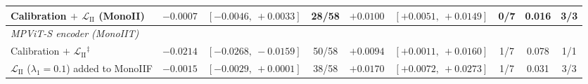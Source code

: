 \documentclass[a4paper,fleqn]{cas-dc}
\begin{document}
\begin{table}[t]
\begin{tabular}{l rcc rccc c}
\quad Calibration $+$ $\mathcal{L}_\textrm{II}$ (MonoII) & $-0.0007$ & $[-0.0046,\ +0.0033]$ & 28/58 & $\mathbf{+0.0100}$ & $[+0.0051,\ +0.0149]$ & 0/7 & 0.016 & 3/3 \\
\midrule
\multicolumn{9}{l}{\emph{MPViT-S encoder (MonoIIT)}} \\
\quad Calibration $+$ $\mathcal{L}_\textrm{II}$$^{\ddagger}$ & $\mathbf{-0.0214}$ & $[-0.0268,\ -0.0159]$ & 50/58 & $\mathbf{+0.0094}$ & $[+0.0011,\ +0.0160]$ & 1/7 & 0.078 & 1/1 \\
\midrule
\quad $\mathcal{L}_\textrm{II}$ ($\lambda_1=0.1$) added to MonoIIF & $-0.0015$ & $[-0.0029,\ +0.0001]$ & 38/58 & $\mathbf{+0.0170}$ & $[+0.0072,\ +0.0273]$ & 1/7 & 0.031 & 3/3 \\
\bottomrule
\end{tabular}
\end{table}
\end{document}
